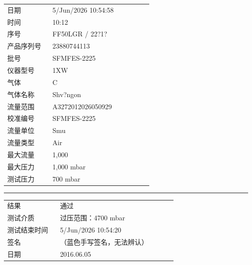 \documentclass[UTF8,10pt,a4paper,fontset=fandol]{ctexart}
\newcommand{\fieldvalue}[1]{#1}
\newcommand{\handwritten}[1]{#1}
\begin{document}
\begin{tabular}{@{}p{0.28\linewidth}p{0.62\linewidth}@{}}
日期 &
\fieldvalue{5/Jun/2026 10:54:58} \\[2pt]
时间 &
\fieldvalue{10:12} \\[2pt]
序号 &
\fieldvalue{FF50LGR / 22?1?} \\[2pt]
产品序列号 &
\fieldvalue{23880744113} \\[2pt]
批号 &
\fieldvalue{SFMFES-2225} \\[2pt]
仪器型号 &
\fieldvalue{1XW} \\[2pt]
气体 &
\fieldvalue{C} \\[2pt]
气体名称 &
\fieldvalue{Shv?ngon} \\[2pt]
流量范围 &
\fieldvalue{A3272012026050929} \\[2pt]
校准编号 &
\fieldvalue{SFMFES-2225} \\[2pt]
流量单位 &
\fieldvalue{Smu} \\[2pt]
流量类型 &
\fieldvalue{Air} \\[2pt]
最大流量 &
\fieldvalue{1,000} \\[2pt]
最大压力 &
\fieldvalue{1,000 mbar} \\[2pt]
测试压力 &
\fieldvalue{700 mbar} \\
\end{tabular}

\vspace{0.5em}
\hrule
\vspace{0.5em}

\begin{tabular}{@{}p{0.28\linewidth}p{0.62\linewidth}@{}}
结果 &
\fieldvalue{通过} \\[2pt]
测试介质 &
\fieldvalue{过压范围：4700 mbar} \\[2pt]
测试结束时间 &
\fieldvalue{5/Jun/2026 10:54:20} \\[2pt]
签名 &
\fieldvalue{\handwritten{（蓝色手写签名，无法辨认）}} \\[2pt]
日期 &
\fieldvalue{\handwritten{2016.06.05}} \\
\end{tabular}
\end{document}
